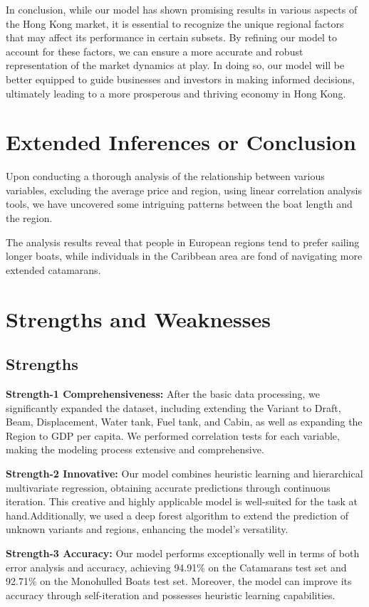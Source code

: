 \documentclass[12pt]{article}  %
\begin{document}
In conclusion, while our model has shown promising results in various aspects of the Hong Kong market, it is essential to recognize the unique regional factors that may affect its performance in certain subsets. By refining our model to account for these factors, we can ensure a more accurate and robust representation of the market dynamics at play. In doing so, our model will be better equipped to guide businesses and investors in making informed decisions, ultimately leading to a more prosperous and thriving economy in Hong Kong.


\section{Extended Inferences or Conclusion}
Upon conducting a thorough analysis of the relationship between various variables, excluding the average price and region, using linear correlation analysis tools, we have uncovered some intriguing patterns between the boat length and the region.

The analysis results reveal that people in European regions tend to prefer sailing longer boats, while individuals in the Caribbean area are fond of navigating more extended catamarans.

\section{Strengths and Weaknesses}
\subsection{Strengths}

\textbf{Strength-1 Comprehensiveness:}
After the basic data processing, we significantly expanded the dataset, including extending the Variant to Draft, Beam, Displacement, Water tank, Fuel tank, and Cabin, as well as expanding the Region to GDP per capita. We performed correlation tests for each variable, making the modeling process extensive and comprehensive.

\textbf{Strength-2 Innovative:}
Our model combines heuristic learning and hierarchical multivariate regression, obtaining accurate predictions through continuous iteration. This creative and highly applicable model is well-suited for the task at hand.Additionally, we used a deep forest algorithm to extend the prediction of unknown variants and regions, enhancing the model's versatility. 

\textbf{Strength-3 Accuracy:}
Our model performs exceptionally well in terms of both error analysis and accuracy, achieving 94.91\% on the Catamarans test set and 92.71\% on the Monohulled Boats test set. Moreover, the model can improve its accuracy through self-iteration and possesses heuristic learning capabilities.
\end{document}
